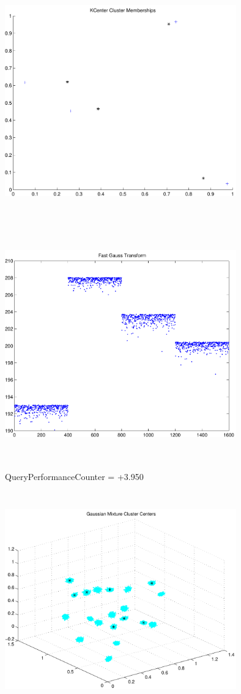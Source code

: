 \documentclass[9pt]{article}
\theoremstyle{plain}
\theoremstyle{definition}
\theoremstyle{remark}
\numberwithin{equation}{section}
\begin{document}
\includegraphics[width=10.0cm,height=10.0cm]{KCenterClusterMemberships_4_Centers.pdf}

\includegraphics[width=10.0cm,height=10.0cm]{FGT4_Centers.pdf}

QueryPerformanceCounter  =  +3.950
\includegraphics[width=10.0cm,height=10.0cm]{GaussianMixture_ClusterCenters20_Centers.pdf}
\end{document}
